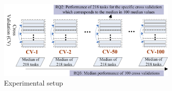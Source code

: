 \begin{figure}[t!]
\centering
\includegraphics[width=8.8cm]{figure/setup.png}
\caption{Experimental setup}
\label{fig:setup}
\end{figure}

